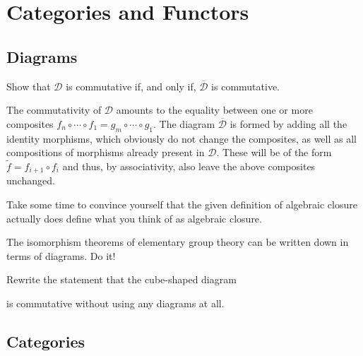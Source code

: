 \chapter{Categories and Functors}

\section{Diagrams}

\bx
Show that $\mathcal{D}$ is commutative if, and only if, $\overline{\mathcal{D}}$ is commutative.
\ex

\bs
The commutativity of $\mathcal{D}$ amounts to the equality between one or more composites $f_n\circ\cdots \circ f_1=g_m\circ \cdots\circ g_1$. The diagram $\overline{\mathcal{D}}$ is formed by adding all the identity morphisms, which obviously do not change the composites, as well as all compositions of morphisms  already present in $\mathcal{D}$. These will be of the form $\widetilde f=f_{i+1}\circ f_i$ and thus, by associativity, also leave the above composites unchanged.
\es

\bx
\ben[label=(\alph*)]
\item Take some time to convince yourself that the given definition of algebraic closure actually does define what you think of as algebraic closure.
\item The isomorphism theorems of elementary group theory can be written down in terms of diagrams. Do it!
\item Rewrite the statement that the cube-shaped diagram 
\bse
{}
\ese
is commutative without using any diagrams at all.
\een
\ex

\bs
\ben[label=(\alph*)]
\item
\item
\item
\een
\es

\section{Categories}

